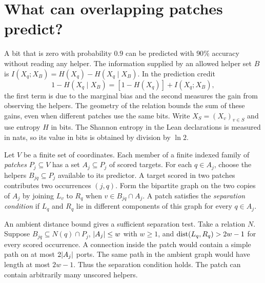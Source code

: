 \section{What can overlapping patches predict?}\label{sec:patches}

A bit that is zero with probability \(0.9\) can be predicted with \(90\%\)
accuracy without reading any helper. The information supplied by an allowed
helper set \(B\) is \(I(X_q;X_B)=H(X_q)-H(X_q\mid X_B)\). In the prediction credit
\[
  1-H(X_q\mid X_B)=[1-H(X_q)]+I(X_q;X_B),
\]
the first term is due to the marginal bias and the second measures the
gain from observing the helpers. The geometry of the relation bounds
the sum of these gains, even when different
patches use the same bits. Write \(X_S=(X_v)_{v\in S}\) and use entropy
\(H\) in bits. The Shannon entropy in the Lean declarations is measured in
nats, so its value in bits is obtained by division by \(\ln 2\).

Let \(V\) be a finite set of coordinates. Each member of a finite indexed family of \emph{patches} \(P_j\subseteq V\)
has a set \(A_j\subseteq P_j\) of scored targets. For each \(q\in A_j\),
choose the helpers \(B_{jq}\subseteq P_j\) available to its predictor.
A target scored in two patches contributes two occurrences \((j,q)\).
Form the bipartite graph on the two copies of \(A_j\) by joining \(L_v\) to
\(R_q\) when \(v\in B_{jq}\cap A_j\). A patch satisfies the
\emph{separation condition} if \(L_q\) and \(R_q\) lie in different
components of this graph for every \(q\in A_j\).

An ambient distance bound gives a sufficient separation test. Take a
relation \(N\). Suppose \(B_{jq}\subseteq N(q)\cap P_j\),
\(\lvert A_j\rvert\le w\) with \(w\ge1\), and
\(\operatorname{dist}(L_q,R_q)>2w-1\) for every scored occurrence. A connection inside
the patch would contain a simple path on at most \(2\lvert A_j\rvert\) ports.
The same path in the ambient graph would have length at most \(2w-1\).
Thus the separation condition holds. The patch can contain arbitrarily
many unscored helpers.

